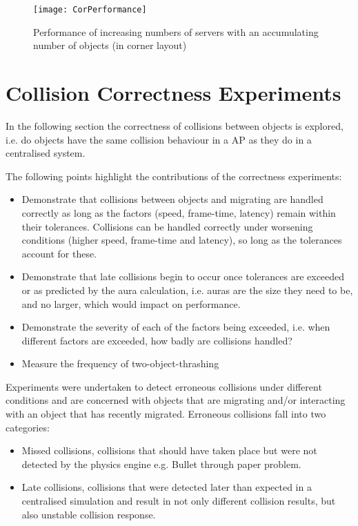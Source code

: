 \begin{figure}[!t]
	\centering
	\texttt{[image: CorPerformance]}
	\caption{Performance of increasing numbers of servers with an accumulating number of objects (in corner layout)}
	\label{fig_PerCor}
\end{figure}

\section{Collision Correctness Experiments}
In the following section the correctness of collisions between objects is explored, i.e. do objects have the same collision behaviour in a AP as they do in a centralised system.

The following points highlight the contributions of the correctness experiments:
\begin{itemize}
	\item Demonstrate that collisions between objects and migrating are handled correctly as long as the factors (speed, frame-time, latency) remain within their tolerances. Collisions can be handled correctly under worsening conditions (higher speed, frame-time and latency), so long as the tolerances account for these.
	\item Demonstrate that late collisions begin to occur once tolerances are exceeded or as predicted by the aura calculation, i.e. auras are the size they need to be, and no larger, which would impact on performance.
	\item Demonstrate the severity of each of the factors being exceeded, i.e. when different factors are exceeded, how badly are collisions handled?
	\item Measure the frequency of two-object-thrashing
\end{itemize}

Experiments were undertaken to detect erroneous collisions under different conditions and are concerned with objects that are migrating and/or interacting with an object that has recently migrated. Erroneous collisions fall into two categories:
\begin{itemize}
	\item Missed collisions, collisions that should have taken place but were not detected by the physics engine e.g. Bullet through paper problem.
	\item Late collisions, collisions that were detected later than expected in a centralised simulation and result in not only different collision results, but also unstable collision response.
\end{itemize}

